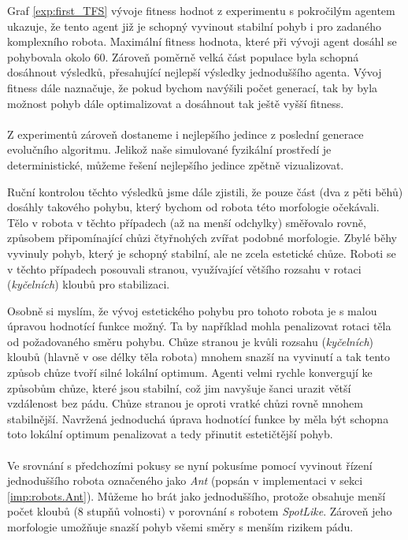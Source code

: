 Graf \ref{exp:first_TFS} vývoje fitness hodnot z experimentu s
pokročilým agentem ukazuje, že tento agent již je schopný vyvinout stabilní
pohyb i pro zadaného komplexního robota. Maximální fitness hodnota, které při
vývoji agent dosáhl se pohybovala okolo 60. Zároveň poměrně velká část populace
byla schopná dosáhnout výsledků, přesahující nejlepší výsledky jednoduššího
agenta. Vývoj fitness dále naznačuje, že pokud bychom navýšili počet generací,
tak by byla možnost pohyb dále optimalizovat a dosáhnout tak ještě vyšší
fitness. 

\paragraph{}
Z experimentů zároveň dostaneme i nejlepšího jedince z poslední generace
evolučního algoritmu. Jelikož naše simulované fyzikální prostředí je
deterministické, můžeme řešení nejlepšího jedince zpětně vizualizovat.

Ruční kontrolou těchto výsledků jsme dále zjistili, že pouze část (dva z pěti
běhů) dosáhly takového pohybu, který bychom od robota této morfologie
očekávali. Tělo v robota v těchto případech (až na menší odchylky) směřovalo
rovně, způsobem připomínající chůzi čtyřnohých zvířat podobné morfologie. Zbylé
běhy vyvinuly pohyb, který je schopný stabilní, ale ne zcela estetické chůze.
Roboti se v těchto případech posouvali stranou, využívající většího rozsahu
v rotaci (\emph{kyčelních}) kloubů pro stabilizaci.

Osobně si myslím, že vývoj estetického pohybu pro tohoto robota je s malou
úpravou hodnotící funkce možný. Ta by například mohla penalizovat rotaci těla
od požadovaného směru pohybu. Chůze stranou je kvůli rozsahu (\emph{kyčelních})
kloubů (hlavně v ose délky těla robota) mnohem snazší na vyvinutí a tak tento
způsob chůze tvoří silné lokální optimum. Agenti velmi rychle konvergují ke
způsobům chůze, které jsou stabilní, což jim navyšuje šanci urazit větší
vzdálenost bez pádu. Chůze stranou je oproti vratké chůzi rovně mnohem
stabilnější. Navržená jednoduchá úprava hodnotící funkce by měla být schopna
toto lokální optimum penalizovat a tedy přinutit estetičtější pohyb.

\paragraph{}
Ve srovnání s předchozími pokusy se nyní pokusíme pomocí vyvinout řízení
jednoduššího robota označeného jako \emph{Ant} (popsán v implementaci v sekci
\ref{imp:robots.Ant}). Můžeme ho brát jako jednoduššího, protože obsahuje menší
počet kloubů (8 stupňů volnosti) v porovnání s robotem \emph{SpotLike}. Zároveň
jeho morfologie umožňuje snazší pohyb všemi směry s menším rizikem pádu.

